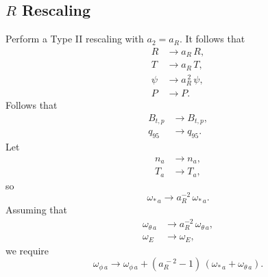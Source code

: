 \documentclass[12pt]{article}
\begin{document}
\subsection{$R$ Rescaling}
Perform a Type II rescaling with $a_2=a_R$.
It follows that
\begin{align}
R&\rightarrow a_R\,R,\\[0.5ex]
T&\rightarrow a_R\,T,\\[0.5ex]
\psi&\rightarrow a_R^{\,2}\,\psi,\\[0.5ex]
P&\rightarrow P.
\end{align}
Follows that
\begin{align}
B_{t,p} &\rightarrow B_{t,p},\\[0.5ex]
q_{95}&\rightarrow q_{95}.
\end{align}
 Let
\begin{align}
n_a&\rightarrow n_a,\\[0.5ex]
T_a&\rightarrow T_a,
\end{align}
so
\begin{equation}
\omega_{\ast\,a} \rightarrow a_R^{-2}\,\omega_{\ast\,a}.
\end{equation}
Assuming that
\begin{align}
\omega_{\theta\,a}&\rightarrow a_R^{-2}\,\omega_{\theta\,a},\\[0.5ex]
\omega_E &\rightarrow \omega_E,
\end{align}
we require
\begin{equation}
\omega_{\phi\,a}\rightarrow \omega_{\phi\,a} + (a_R^{\,-2}-1)\,(\omega_{\ast\,a}+\omega_{\theta\,a}).
\end{equation}
\end{document}
